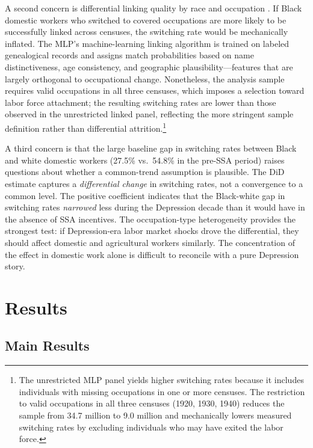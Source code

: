 \documentclass[12pt]{article}
\begin{document}
A second concern is differential linking quality by race and occupation \citep{bailey2020}. If Black domestic workers who switched to covered occupations are more likely to be successfully linked across censuses, the switching rate would be mechanically inflated. The MLP's machine-learning linking algorithm is trained on labeled genealogical records and assigns match probabilities based on name distinctiveness, age consistency, and geographic plausibility---features that are largely orthogonal to occupational change. Nonetheless, the analysis sample requires valid occupations in all three censuses, which imposes a selection toward labor force attachment; the resulting switching rates are lower than those observed in the unrestricted linked panel, reflecting the more stringent sample definition rather than differential attrition.\footnote{The unrestricted MLP panel yields higher switching rates because it includes individuals with missing occupations in one or more censuses. The restriction to valid occupations in all three censuses (1920, 1930, 1940) reduces the sample from 34.7 million to 9.0 million and mechanically lowers measured switching rates by excluding individuals who may have exited the labor force.}

A third concern is that the large baseline gap in switching rates between Black and white domestic workers (27.5\% vs.\ 54.8\% in the pre-SSA period) raises questions about whether a common-trend assumption is plausible. The DiD estimate captures a \textit{differential change} in switching rates, not a convergence to a common level. The positive coefficient indicates that the Black-white gap in switching rates \textit{narrowed} less during the Depression decade than it would have in the absence of SSA incentives. The occupation-type heterogeneity provides the strongest test: if Depression-era labor market shocks drove the differential, they should affect domestic and agricultural workers similarly. The concentration of the effect in domestic work alone is difficult to reconcile with a pure Depression story.


\section{Results}

\subsection{Main Results}


\end{document}
